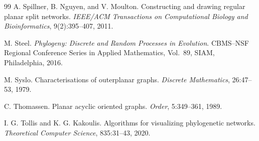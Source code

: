 \documentclass[pdflatex,sn-mathphys-num]{sn-jnl}
\theoremstyle{thmstyleone}%
\theoremstyle{thmstyletwo}%
\theoremstyle{thmstylethree}%
\begin{document}
\begin{thebibliography}{99}
A. Spillner, B. Nguyen, and V. Moulton.
Constructing and drawing regular planar split networks.
\textit{IEEE/ACM Transactions on Computational Biology and Bioinformatics},
9(2):395--407, 2011.

 M. Steel. \textit{Phylogeny: Discrete and Random Processes in Evolution}. CBMS--NSF Regional Conference Series in Applied Mathematics, Vol.~89, SIAM, Philadelphia, 2016.

M. Syslo.
Characterisations of outerplanar graphs.
\textit{Discrete Mathematics},
26:47--53, 1979.

C. Thomassen.
Planar acyclic oriented graphs.
\textit{Order},
5:349--361, 1989.

I. G. Tollis and K. G. Kakoulis.
Algorithms for visualizing phylogenetic networks.
\textit{Theoretical Computer Science},
835:31--43, 2020.




\end{thebibliography}
\end{document}
